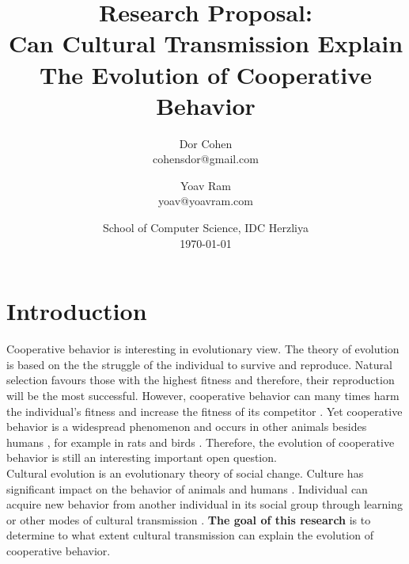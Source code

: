 \documentclass{article}
\title{Research Proposal:\\  Can Cultural Transmission Explain The Evolution of Cooperative Behavior}
\author{Dor Cohen \\ cohensdor@gmail.com \and Yoav Ram \\ yoav@yoavram.com}
\date{School of Computer Science, IDC Herzliya\\ \today}
\begin{document}
\maketitle

\section*{Introduction}
Cooperative behavior is interesting in evolutionary view. The theory of evolution is based on the the struggle of the individual to survive and reproduce. Natural selection favours those with the highest fitness and therefore, their reproduction will be the most successful. However, cooperative behavior can many times harm the individual's fitness and increase the fitness of its competitor \cite{axelrod1981evolution}. Yet cooperative behavior is a widespread phenomenon and occurs in other animals besides humans \cite{dugatkin1997cooperation}, for example in rats \cite{rice1962altruism} and birds \cite{krams2008experimental}.
Therefore, the evolution of cooperative behavior is still an interesting important open question.
\\Cultural evolution is an evolutionary theory of social change. Culture has significant impact on the behavior of animals \cite{bonner2018evolution} and humans \cite{ihara2004cultural,jeong2018bronze}. Individual can acquire new behavior from another individual in its social group  through learning or other modes of cultural transmission \cite{richerson2008not}.
\textbf{The goal of this research} is to determine to what extent cultural transmission can explain the evolution of cooperative behavior.
\end{document}
